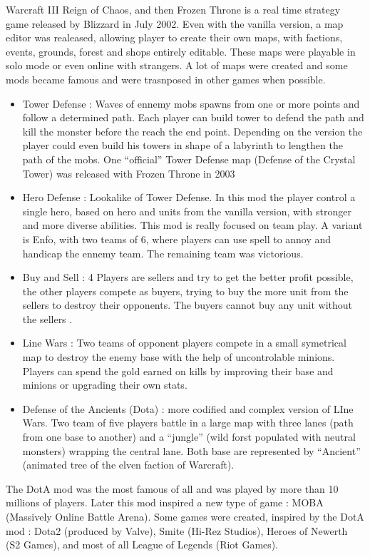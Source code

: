 \documentclass[a4paper,11pt]{article}
\begin{document}
Warcraft III Reign of Chaos, and then Frozen Throne is a real time strategy game released by Blizzard in July 2002. Even with the vanilla version, a map editor was realeased, allowing player to create their own maps, with factions, events, grounds, forest and shops entirely editable. These maps were playable in solo mode or even online with strangers. A lot of maps were created and some mods became famous and were trasnposed in other games when possible.
\begin{itemize}
\item Tower Defense : Waves of ennemy mobs spawns from one or more points and follow a determined path. Each player can build tower to defend the path and kill the monster before the reach the end point. Depending on the version the player could even build his towers in shape of a labyrinth to lengthen the path of the mobs. One “official” Tower Defense map (Defense of the Crystal Tower) was released with Frozen Throne in 2003
\item Hero Defense : Lookalike of Tower Defense. In this mod the player control a single hero, based on hero and units from the vanilla version, with stronger and more diverse abilities. This mod is really focused on team play. A variant is Enfo, with two teams of 6, where players can use spell to annoy and handicap the ennemy team. The remaining team was victorious.
\item Buy and Sell : 4 Players are sellers and try to get the better profit possible, the other players compete as buyers, trying to buy the more unit from the sellers to destroy their opponents. The buyers cannot buy any unit without the sellers . 
\item Line Wars : Two teams of opponent players compete in a small symetrical map to destroy the enemy base with the help of uncontrolable minions. Players can spend the gold earned on kills by improving their base and minions or upgrading their own stats.
\item Defense of the Ancients (Dota) : more codified and complex version of LIne Wars. Two team of five players battle in a large map with three lanes (path from one base to another) and 
a “jungle” (wild forst populated with neutral monsters) wrapping the central lane. Both base are represented by “Ancient” (animated tree of the elven faction of Warcraft).
\end{itemize}

The DotA mod was the most famous of all and was played by more than 10 millions of players. Later this mod inspired a new type of game : MOBA (Massively Online Battle Arena). Some games were created, inspired by the DotA mod : Dota2 (produced by Valve), Smite (Hi-Rez Studios), Heroes of Newerth (S2 Games), and most of all League of Legends (Riot Games). 
\end{document}

